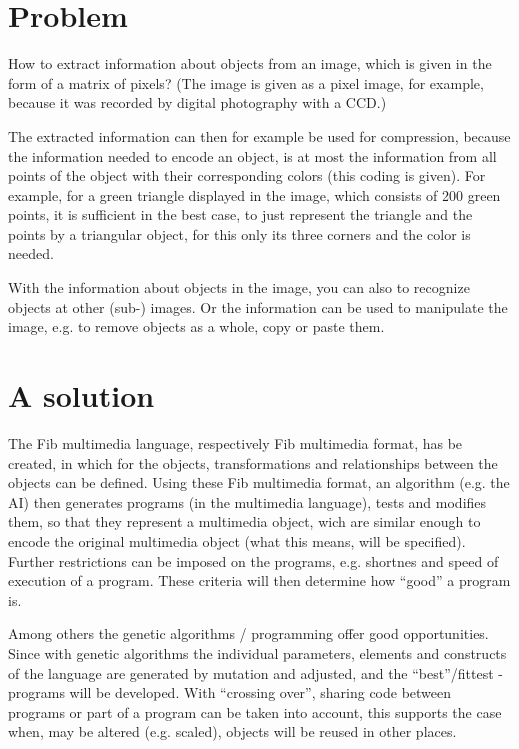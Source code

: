 \documentclass[11pt,a4paper]{article}
\begin{document}
\section{Problem}
\label{secProblem}

How to extract information about objects from an image, which is given in the form of a matrix of pixels? (The image is given as a pixel image, for example, because it was recorded by digital photography with a CCD.)

The extracted information can then for example be used for compression, because the information needed to encode an object, is at most the information from all points of the object with their corresponding colors (this coding is given). For example, for a green triangle displayed in the image, which consists of 200 green points, it is sufficient in the best case, to just represent the triangle and the points by a triangular object, for this only its three corners and the color is needed.

With the information about objects in the image, you can also to recognize objects at other (sub-) images. Or the information can be used to manipulate the image, e.g. to remove objects as a whole, copy or paste them.



\section{A solution}
\label{secSolution}

The Fib multimedia language, respectively Fib multimedia format, has be created, in which for the objects, transformations and relationships between the objects can be defined. Using these Fib multimedia format, an algorithm (e.g. the AI) then generates programs (in the multimedia language), tests and modifies them, so that they represent a multimedia object, wich are similar enough to encode the original multimedia object (what this means, will be specified). Further restrictions can be imposed on the programs, e.g. shortnes and speed of execution of a program. These criteria will then determine how ``good'' a program is.

Among others the genetic algorithms / programming offer good opportunities. Since with genetic algorithms the individual parameters, elements and constructs of the language are generated by mutation and adjusted, and the ``best''/fittest -programs will be developed. With ``crossing over'', sharing code between programs or part of a program can be taken into account, this supports the case when, may be altered (e.g. scaled), objects will be reused in other places.
\end{document}
